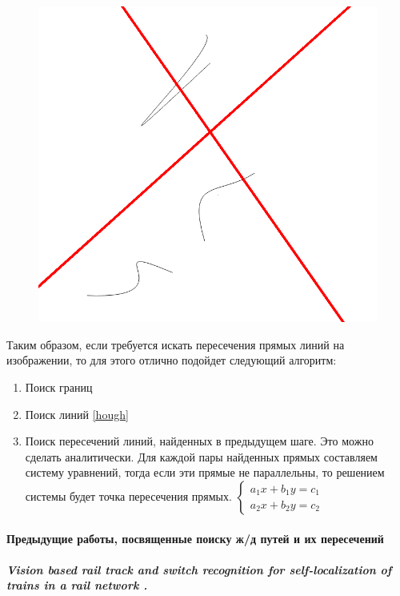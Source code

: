 \begin{enumerate}
\begin{figure}[!h]
\begin{minipage}{0.45\textwidth}
			\caption[Y]{}
			\label{fig:canny_ex}
		\end{minipage}
		\begin{minipage}{0.45\textwidth}
			\centering
			\includegraphics[width=0.7\linewidth]{pictures/hough_ex}
			\caption[X]{}
			\label{fig:hough_ex}
		\end{minipage}
	\end{figure}
\end{enumerate}

Таким образом, если требуется искать пересечения прямых линий на изображении, то для этого отлично подойдет следующий алгоритм:
\begin{enumerate}
	\item Поиск границ \cite{b:canny}
	\item Поиск линий \ref{hough}
	\item Поиск пересечений линий, найденных в предыдущем шаге. Это можно сделать аналитически. Для каждой пары найденных прямых составляем систему уравнений, тогда если эти прямые не параллельны, то решением системы будет точка пересечения прямых.
$
\begin{cases}
a_1x + b_1y = c_1 
\\
a_2x + b_2y = c_2 
\end{cases}
$
\end{enumerate}

\paragraph{Предыдущие работы, посвященные поиску ж/д путей и их пересечений}

\subparagraph{Vision based rail track and switch recognition for self-localization of trains in a rail network \cite{b:hough_work1}.}

